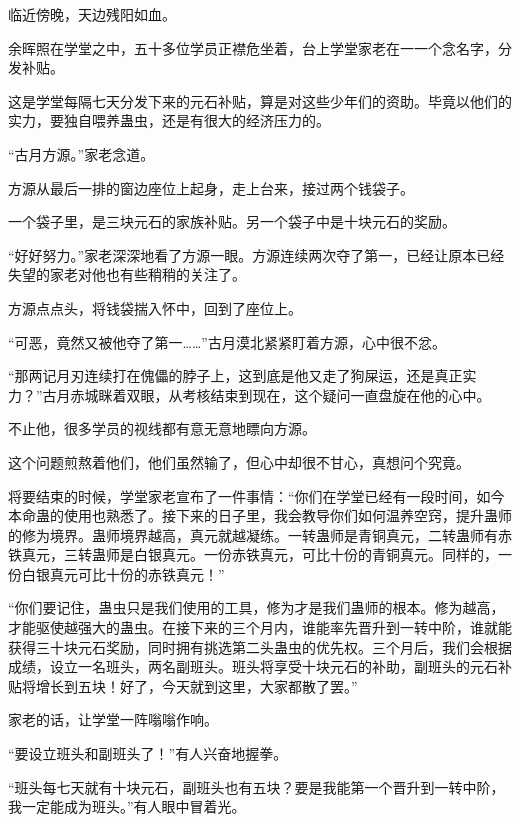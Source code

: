 
\begin{this_body}



临近傍晚，天边残阳如血。

余晖照在学堂之中，五十多位学员正襟危坐着，台上学堂家老在一一个念名字，分发补贴。

这是学堂每隔七天分发下来的元石补贴，算是对这些少年们的资助。毕竟以他们的实力，要独自喂养蛊虫，还是有很大的经济压力的。

“古月方源。”家老念道。

方源从最后一排的窗边座位上起身，走上台来，接过两个钱袋子。

一个袋子里，是三块元石的家族补贴。另一个袋子中是十块元石的奖励。

“好好努力。”家老深深地看了方源一眼。方源连续两次夺了第一，已经让原本已经失望的家老对他也有些稍稍的关注了。

方源点点头，将钱袋揣入怀中，回到了座位上。

“可恶，竟然又被他夺了第一……”古月漠北紧紧盯着方源，心中很不忿。

“那两记月刃连续打在傀儡的脖子上，这到底是他又走了狗屎运，还是真正实力？”古月赤城眯着双眼，从考核结束到现在，这个疑问一直盘旋在他的心中。

不止他，很多学员的视线都有意无意地瞟向方源。

这个问题煎熬着他们，他们虽然输了，但心中却很不甘心，真想问个究竟。

将要结束的时候，学堂家老宣布了一件事情：“你们在学堂已经有一段时间，如今本命蛊的使用也熟悉了。接下来的日子里，我会教导你们如何温养空窍，提升蛊师的修为境界。蛊师境界越高，真元就越凝练。一转蛊师是青铜真元，二转蛊师有赤铁真元，三转蛊师是白银真元。一份赤铁真元，可比十份的青铜真元。同样的，一份白银真元可比十份的赤铁真元！”

“你们要记住，蛊虫只是我们使用的工具，修为才是我们蛊师的根本。修为越高，才能驱使越强大的蛊虫。在接下来的三个月内，谁能率先晋升到一转中阶，谁就能获得三十块元石奖励，同时拥有挑选第二头蛊虫的优先权。三个月后，我们会根据成绩，设立一名班头，两名副班头。班头将享受十块元石的补助，副班头的元石补贴将增长到五块！好了，今天就到这里，大家都散了罢。”

家老的话，让学堂一阵嗡嗡作响。

“要设立班头和副班头了！”有人兴奋地握拳。

“班头每七天就有十块元石，副班头也有五块？要是我能第一个晋升到一转中阶，我一定能成为班头。”有人眼中冒着光。


\end{this_body}
